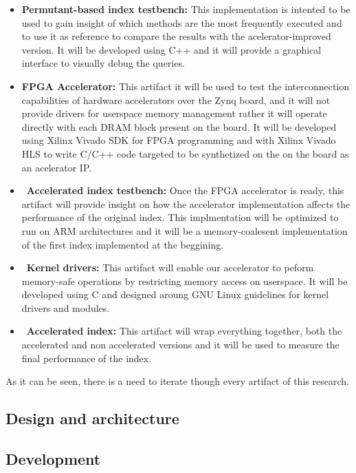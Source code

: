 \begin{itemize}
    \item {\textbf{Permutant-based index testbench:} This implementation is intented to be used to gain insight of which methods are the most frequently
    executed and to use it as reference to compare the results with the acelerator-improved version. It will be developed using C++ and it will provide 
    a graphical interface to visually debug the queries.}
    \item {\textbf{FPGA Accelerator:} This artifact it will be used to test the interconnection capabilities of hardware accelerators over the Zynq board,
    and it will not provide drivers for userspace memory management rather it will operate directly with each DRAM block present on the board. It will be 
    developed using Xilinx Vivado SDK for FPGA programming and with Xilinx Vivado HLS to write C/C++ code targeted to be synthetized on the on the board
    as an acelerator IP.}
    \item {\textbf{Accelerated index testbench:} Once the FPGA accelerator is ready, this artifact will provide insight on how the accelerator implementation affects
    the performance of the original index. This implmentation will be optimized to run on ARM architectures and it will be a memory-coalesent implementation
    of the first index implemented at the beggining.}
    \item {\textbf{Kernel drivers:} This artifact will enable our accelerator to peform memory-safe operations by restricting memory access on userspace.
    It will be developed using C and designed aroung GNU Linux guidelines for kernel drivers and modules.}
    \item {\textbf{Accelerated index:} This artifact will wrap everything together, both the accelerated and non accelerated versions and it will be used
    to measure the final performance of the index.}
\end{itemize}

As it can be seen, there is a need to iterate though every artifact of this research.

\subsection{Design and architecture}
\subsection{Development}

